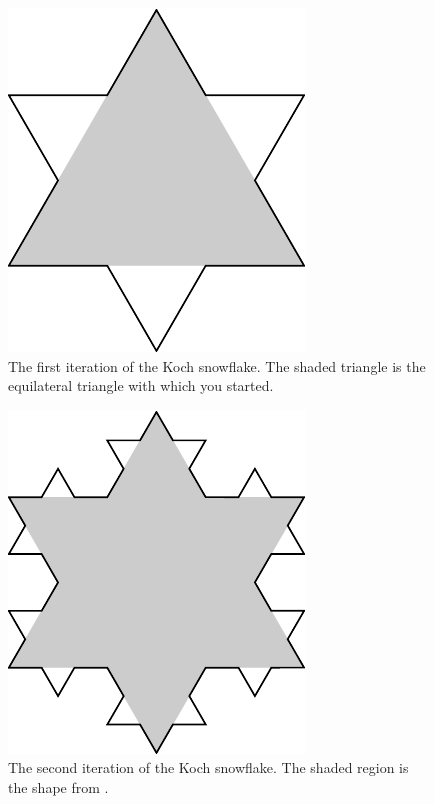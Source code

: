 \documentclass[a4paper,oneside,12pt]{article}
\begin{document}
\begin{problem}
{\begin{solution}
\begin{figure}[!htbp]
\centering
\includegraphics[scale=1]{image/05/koch-snowflake-1-area.pdf}
\caption{%
  The first iteration of the Koch snowflake.  The shaded triangle is
  the equilateral triangle with which you started.
}
\label{fig:Koch_snowflake_first_iteration_shaded_area}
\end{figure}

\begin{figure}[!htbp]
\centering
\includegraphics[scale=1]{image/05/koch-snowflake-2-area.pdf}
\caption{%
  The second iteration of the Koch snowflake.  The shaded region is
  the shape from
  .
}
\label{fig:Koch_snowflake_second_iteration_shaded_area}
\end{figure}


\end{solution}}
\end{problem}
\end{document}
